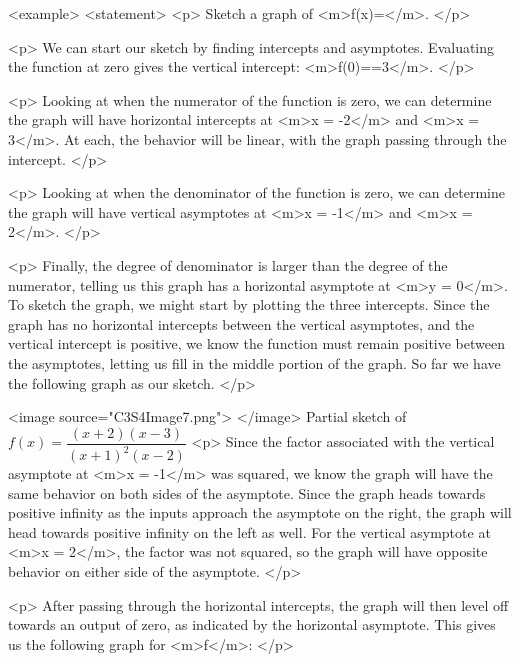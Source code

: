         <example>
            <statement>
                <p>
                    Sketch a graph of <m>f(x)=</m>.
                </p>

                <p>
                    We can start our sketch by finding intercepts and asymptotes.
                    Evaluating the function at zero gives the vertical intercept: <m>f(0)==3</m>.
                </p>

                <p>
                    Looking at when the numerator of the function is zero, we can determine the graph will have horizontal intercepts at <m>x = -2</m> and <m>x = 3</m>.
                    At each, the behavior will be linear, with the graph passing through the intercept.
                </p>

                <p>
                    Looking at when the denominator of the function is zero, we can determine the graph will have vertical asymptotes at <m>x = -1</m> and <m>x = 2</m>.
                </p>

                <p>
                    Finally, the degree of denominator is larger than the degree of the numerator, telling us this graph has a horizontal asymptote at <m>y = 0</m>.
                    To sketch the graph, we might start by plotting the three intercepts.
                    Since the graph has no horizontal intercepts between the vertical asymptotes, and the vertical intercept is positive, we know the function must remain positive between the asymptotes, letting us fill in the middle portion of the graph.
                    So far we have the following graph as our sketch.
                </p>

                <image source="C3S4Image7.png">
                </image>
                Partial sketch of $f(x)=\dfrac{(x+2)(x-3)}{(x+1)^2 (x-2)}$
                <p>
                    Since the factor associated with the vertical asymptote at <m>x = -1</m> was squared, we know the graph will have the same behavior on both sides of the asymptote.
                    Since the graph heads towards positive infinity as the inputs approach the asymptote on the right, the graph will head towards positive infinity on the left as well.
                    For the vertical asymptote at <m>x = 2</m>, the factor was not squared, so the graph will have opposite behavior on either side of the asymptote.
                </p>

                <p>
                    After passing through the horizontal intercepts, the graph will then level off towards an output of zero, as indicated by the horizontal asymptote.
                    This gives us the following graph for <m>f</m>:
                </p>

